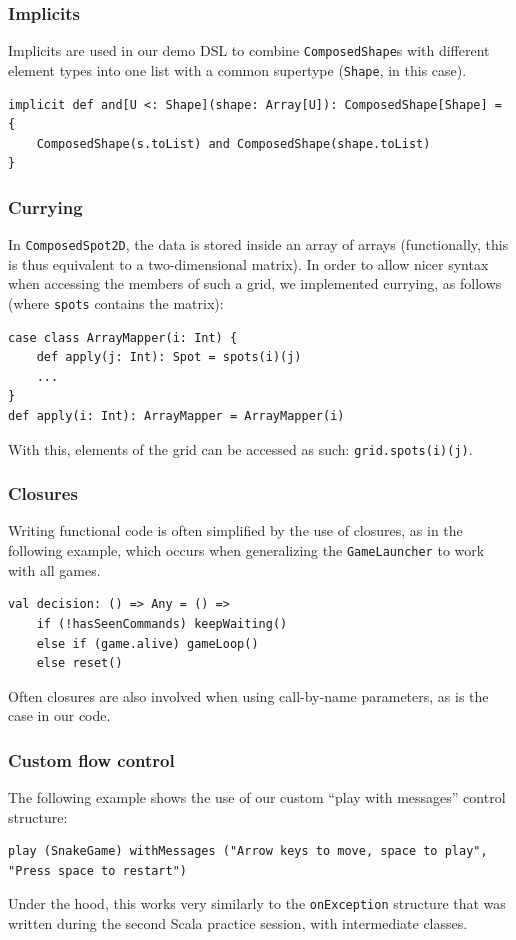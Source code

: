 \documentclass[journal,onecolumn, 9pt]{IEEEtran}
\theoremstyle{definition}
\newcommand{\scala}[1]{\texttt{#1}}
\begin{document}
\subsubsection{Implicits}
Implicits are used in our demo DSL to combine \scala{ComposedShape}s with different element types into one list with a common supertype (\scala{Shape}, in this case).
\begin{verbatim}
implicit def and[U <: Shape](shape: Array[U]): ComposedShape[Shape] = {
	ComposedShape(s.toList) and ComposedShape(shape.toList)
}
\end{verbatim}

\subsubsection{Currying}
In \scala{ComposedSpot2D}, the data is stored inside an array of arrays (functionally, this is thus equivalent to a two-dimensional matrix).
In order to allow nicer syntax when accessing the members of such a grid, we implemented currying, as follows (where \scala{spots} contains the matrix):
\begin{verbatim}
case class ArrayMapper(i: Int) {
	def apply(j: Int): Spot = spots(i)(j)
	...
}
def apply(i: Int): ArrayMapper = ArrayMapper(i)
\end{verbatim}
With this, elements of the grid can be accessed as such: \scala{grid.spots(i)(j)}.

\subsubsection{Closures}
Writing functional code is often simplified by the use of closures, as in the following example, which occurs when generalizing the \scala{GameLauncher} to work with all games.
\begin{verbatim}
val decision: () => Any = () =>
	if (!hasSeenCommands) keepWaiting()
	else if (game.alive) gameLoop()
	else reset()
\end{verbatim}
Often closures are also involved when using call-by-name parameters, as is the case in our code.

\subsubsection{Custom flow control}
The following example shows the use of our custom ``play with messages'' control structure:
\begin{verbatim}
play (SnakeGame) withMessages ("Arrow keys to move, space to play", "Press space to restart")
\end{verbatim}
Under the hood, this works very similarly to the \scala{onException} structure that was written during the second Scala practice session, with intermediate classes.
\end{document}
